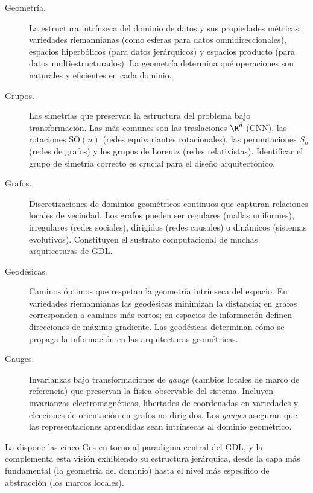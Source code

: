 \begin{description}
\item[Geometr\'ia.] La estructura intr\'inseca del dominio de datos y sus
propiedades m\'etricas: variedades riemannianas (como esferas para datos
omnidireccionales), espacios hiperb\'olicos (para datos jer\'arquicos) y espacios
producto (para datos multiestructurados). La geometr\'ia determina qu\'e
operaciones son naturales y eficientes en cada dominio.
\item[Grupos.] Las simetr\'ias que preservan la estructura del problema bajo
transformaci\'on. Las m\'as comunes son las traslaciones $\R^d$ (CNN), las
rotaciones $\mathrm{SO}(n)$ (redes equivariantes rotacionales), las permutaciones
$S_n$ (redes de grafos) y los grupos de Lorentz (redes relativistas). Identificar
el grupo de simetr\'ia correcto es crucial para el dise\~no arquitect\'onico.
\item[Grafos.] Discretizaciones de dominios geom\'etricos continuos que capturan
relaciones locales de vecindad. Los grafos pueden ser regulares (mallas
uniformes), irregulares (redes sociales), dirigidos (redes causales) o din\'amicos
(sistemas evolutivos). Constituyen el sustrato computacional de muchas
arquitecturas de GDL.
\item[Geod\'esicas.] Caminos \'optimos que respetan la geometr\'ia intr\'inseca
del espacio. En variedades riemannianas las geod\'esicas minimizan la distancia;
en grafos corresponden a caminos m\'as cortos; en espacios de informaci\'on
definen direcciones de m\'aximo gradiente. Las geod\'esicas determinan c\'omo se
propaga la informaci\'on en las arquitecturas geom\'etricas.
\item[Gauges.] Invarianzas bajo transformaciones de \emph{gauge} (cambios locales
de marco de referencia) que preservan la f\'isica observable del sistema.
Incluyen invarianzas electromagn\'eticas, libertades de coordenadas en variedades
y elecciones de orientaci\'on en grafos no dirigidos. Los \emph{gauges} aseguran
que las representaciones aprendidas sean intr\'insecas al dominio geom\'etrico.
\end{description}

La  dispone las cinco Ges en torno al paradigma central
del GDL, y la  complementa esta visi\'on exhibiendo su
estructura jer\'arquica, desde la capa m\'as fundamental (la geometr\'ia del
dominio) hasta el nivel m\'as espec\'ifico de abstracci\'on (los marcos locales).

